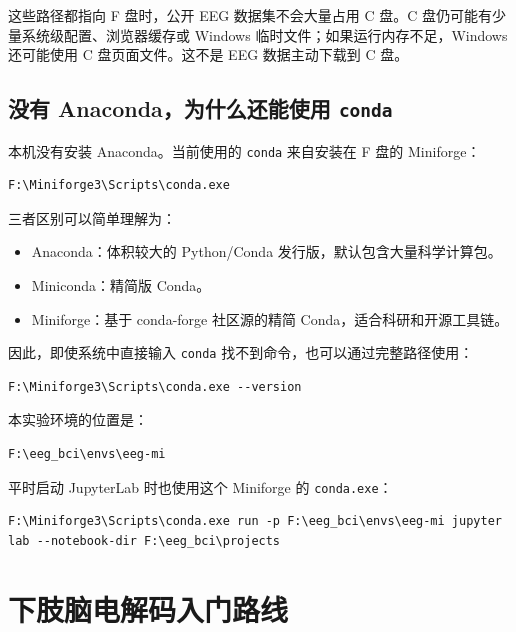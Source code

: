 \documentclass[UTF8,a4paper,12pt]{ctexart}
\begin{document}
这些路径都指向 F 盘时，公开 EEG 数据集不会大量占用 C 盘。C 盘仍可能有少量系统级配置、浏览器缓存或 Windows 临时文件；如果运行内存不足，Windows 还可能使用 C 盘页面文件。这不是 EEG 数据主动下载到 C 盘。

\subsection{没有 Anaconda，为什么还能使用 \texttt{conda}}

本机没有安装 Anaconda。当前使用的 \texttt{conda} 来自安装在 F 盘的 Miniforge：

\begin{lstlisting}[language={}]
F:\Miniforge3\Scripts\conda.exe
\end{lstlisting}

三者区别可以简单理解为：

\begin{itemize}
  \item Anaconda：体积较大的 Python/Conda 发行版，默认包含大量科学计算包。
  \item Miniconda：精简版 Conda。
  \item Miniforge：基于 conda-forge 社区源的精简 Conda，适合科研和开源工具链。
\end{itemize}

因此，即使系统中直接输入 \texttt{conda} 找不到命令，也可以通过完整路径使用：

\begin{lstlisting}[language={},caption={使用 Miniforge 中的 conda}]
F:\Miniforge3\Scripts\conda.exe --version
\end{lstlisting}

本实验环境的位置是：

\begin{lstlisting}[language={}]
F:\eeg_bci\envs\eeg-mi
\end{lstlisting}

平时启动 JupyterLab 时也使用这个 Miniforge 的 \texttt{conda.exe}：

\begin{lstlisting}[language={},caption={启动 JupyterLab}]
F:\Miniforge3\Scripts\conda.exe run -p F:\eeg_bci\envs\eeg-mi jupyter lab --notebook-dir F:\eeg_bci\projects
\end{lstlisting}

\section{下肢脑电解码入门路线}
\end{document}
